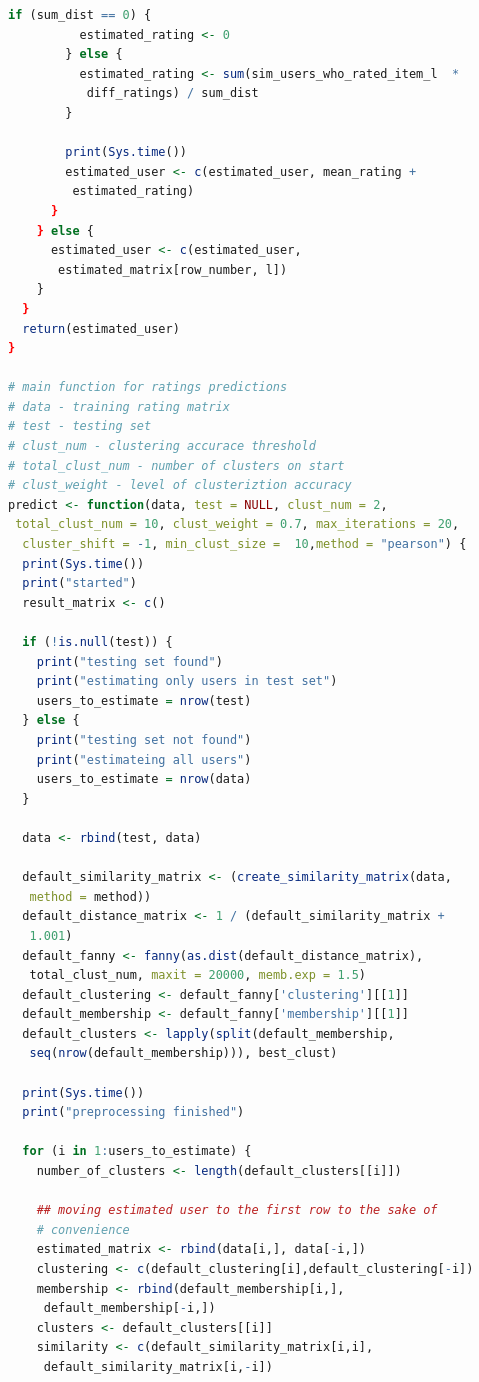 \documentclass[a4paper, 12pt]{article} %
\begin{document}
\begin{lstlisting}[language=R]
        if (sum_dist == 0) {
          estimated_rating <- 0
        } else {
          estimated_rating <- sum(sim_users_who_rated_item_l  *
           diff_ratings) / sum_dist
        }
        
        print(Sys.time())
        estimated_user <- c(estimated_user, mean_rating +
         estimated_rating)
      }
    } else {
      estimated_user <- c(estimated_user,
       estimated_matrix[row_number, l])
    } 
  } 
  return(estimated_user)
}

# main function for ratings predictions 
# data - training rating matrix
# test - testing set
# clust_num - clustering accurace threshold
# total_clust_num - number of clusters on start
# clust_weight - level of clusteriztion accuracy
predict <- function(data, test = NULL, clust_num = 2,
 total_clust_num = 10, clust_weight = 0.7, max_iterations = 20,
  cluster_shift = -1, min_clust_size =  10,method = "pearson") {
  print(Sys.time())
  print("started")
  result_matrix <- c()
  
  if (!is.null(test)) {
    print("testing set found")
    print("estimating only users in test set")
    users_to_estimate = nrow(test)
  } else {
    print("testing set not found")
    print("estimateing all users")
    users_to_estimate = nrow(data)
  }
  
  data <- rbind(test, data)
  
  default_similarity_matrix <- (create_similarity_matrix(data,
   method = method)) 
  default_distance_matrix <- 1 / (default_similarity_matrix +
   1.001)
  default_fanny <- fanny(as.dist(default_distance_matrix),
   total_clust_num, maxit = 20000, memb.exp = 1.5)
  default_clustering <- default_fanny['clustering'][[1]]
  default_membership <- default_fanny['membership'][[1]]
  default_clusters <- lapply(split(default_membership,
   seq(nrow(default_membership))), best_clust)
  
  print(Sys.time())
  print("preprocessing finished")
  
  for (i in 1:users_to_estimate) {
    number_of_clusters <- length(default_clusters[[i]]) 
    
    ## moving estimated user to the first row to the sake of
    # convenience
    estimated_matrix <- rbind(data[i,], data[-i,])
    clustering <- c(default_clustering[i],default_clustering[-i])
    membership <- rbind(default_membership[i,],
     default_membership[-i,])
    clusters <- default_clusters[[i]]
    similarity <- c(default_similarity_matrix[i,i],
     default_similarity_matrix[i,-i])
    

\end{lstlisting}
\end{document}
